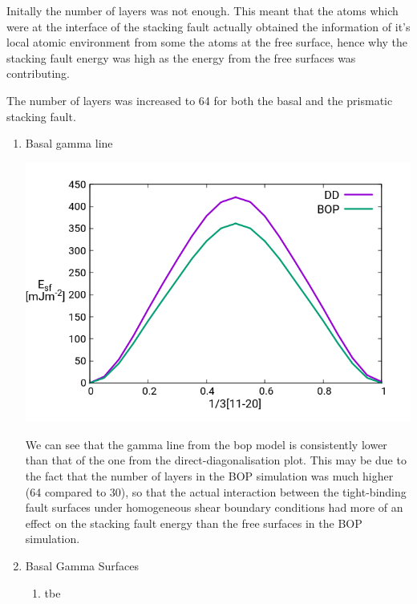 \documentclass[11pt]{article}
\begin{document}
Initally the number of layers was not enough. This meant that the atoms which
were at the interface of the stacking fault actually obtained the information
of it's local atomic environment from some the atoms at the free surface,
hence why the stacking fault energy was high as the energy from the free
surfaces was contributing. 

The number of layers was increased to 64 for both the basal and the prismatic
stacking fault. 

\begin{enumerate}
\item Basal gamma line
\label{sec:orgc04e263}

\begin{center}
\includegraphics[width=.9\linewidth]{Images/basal_gamma_line_tbe_15_layers_bop_64_layers.png}
\end{center}

We can see that the gamma line from the bop model is consistently lower than
that of the one from the direct-diagonalisation plot. This may be due to the
fact that the number of layers in the BOP simulation was much higher (64
compared to 30), so that the actual interaction between the tight-binding
fault surfaces under homogeneous shear boundary conditions had more of an
effect on the stacking fault energy than the free surfaces in the BOP
simulation. 

\item Basal Gamma Surfaces
\label{sec:orgf831682}

\begin{enumerate}
\item tbe
\label{sec:org6dc18cf}


\end{enumerate}
\end{enumerate}
\end{document}
